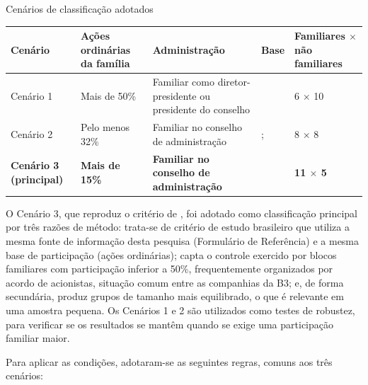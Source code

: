 \begin{quadro}[htb]
\caption{Cenários de classificação adotados}\label{qua:cenarios}
\centering\small
\begin{tabularx}{\textwidth}{|P{2.2cm}|P{2.2cm}|L|L|P{2.3cm}|}
\hline
\textbf{Cenário} & \textbf{Ações ordinárias da família} & \textbf{Administração} & \textbf{Base} & \textbf{Familiares $\times$ não familiares} \\ \hline
Cenário 1 & Mais de 50\% & Familiar como diretor-presidente ou presidente do conselho &  & 6 $\times$ 10 \\ \hline
Cenário 2 & Pelo menos 32\% & Familiar no conselho de administração & ;  & 8 $\times$ 8 \\ \hline
\textbf{Cenário 3 (principal)} & \textbf{Mais de 15\%} & \textbf{Familiar no conselho de administração} & \textbf{} & \textbf{11 $\times$ 5} \\ \hline
\end{tabularx}
\end{quadro}

O Cenário 3, que reproduz o critério de , foi adotado como
classificação principal por três razões de método: trata-se de critério de estudo
brasileiro que utiliza a mesma fonte de informação desta pesquisa (Formulário de
Referência) e a mesma base de participação (ações ordinárias); capta o controle
exercido por blocos familiares com participação inferior a 50\%, frequentemente
organizados por acordo de acionistas, situação comum entre as companhias da B3; e,
de forma secundária, produz grupos de tamanho mais equilibrado, o que é relevante em uma amostra
pequena. Os Cenários 1 e 2 são utilizados como testes de robustez, para verificar
se os resultados se mantêm quando se exige uma participação familiar maior.

Para aplicar as condições, adotaram-se as seguintes regras, comuns aos três
cenários:

